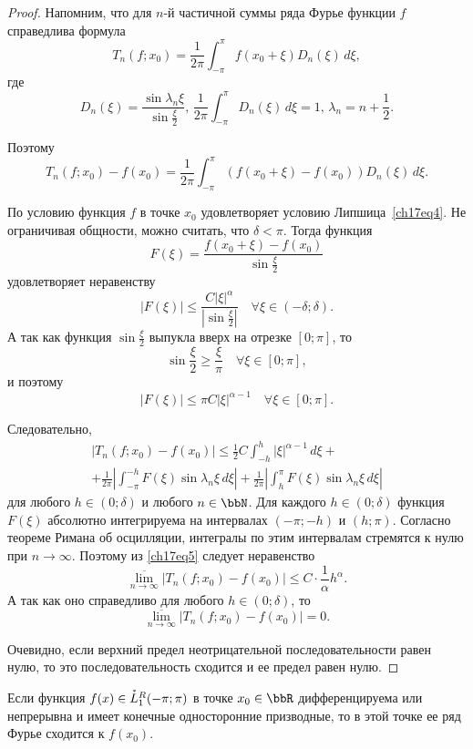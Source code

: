 \begin{proof}
Напомним, что для $n$-й частичной суммы ряда Фурье функции $f$ справедлива формула
$$
T_n(f;x_0) = \frac{1}{2\pi} \int_{-\pi}^{\pi} f(x_0 + \xi) D_n(\xi) \,d\xi,
$$
где
$$
D_n(\xi) = \frac{\sin{\lambda_n \xi}}{\sin{\frac{\xi}{2}}}, \, \frac{1}{2\pi}\int_{-\pi}^{\pi} D_n(\xi) \,d\xi = 1, \, \lambda_n = n + \frac12.
$$

Поэтому 
$$
T_n(f; x_0) - f(x_0) = \frac{1}{2\pi}\int_{-\pi}^{\pi}(f(x_0 + \xi) - f(x_0))D_n(\xi)\,d\xi.
$$

По условию функция $f$ в точке $x_0$ удовлетворяет условию Липшица~\eqref{ch17eq4}. Не ограничивая общности, можно считать, что $\delta < \pi$. Тогда функция 
$$
F(\xi) = \frac{f(x_0 + \xi) - f(x_0)}{\sin{\frac{\xi}{2}}}
$$
удовлетворяет неравенству
$$
|F(\xi)| \le \frac{C|\xi|^\alpha}{\left| \sin{\frac{\xi}{2}} \right|} \quad \forall \xi \in (-\delta; \delta).
$$
А так как функция $\sin{\frac{\xi}{2}}$ выпукла вверх на отрезке $[0; \pi]$, то
$$
\sin{\frac{\xi}{2}} \ge \frac{\xi}{\pi} \quad \forall \xi \in [0; \pi],
$$
и поэтому 
$$
|F(\xi)| \le \pi C |\xi|^{\alpha - 1} \quad \forall \xi \in [0; \pi].
$$

Следовательно,
\begin{multline} \label{ch17eq5}
|T_n(f; x_0) - f(x_0)| \le \frac{1}{2} C \int_{-h}^{h} |\xi|^{\alpha - 1}\,d\xi + \\
+ \frac{1}{2\pi} \left| \int_{-\pi}^{-h} F(\xi) \sin{\lambda_n \xi} \,d\xi \right| + \frac{1}{2\pi} \left| \int_{h}^{\pi} F(\xi) \sin{\lambda_n \xi} \,d\xi \right|
\end{multline}
для любого $h \in (0; \delta)$ и любого $n \in \bbN$. Для каждого $h \in (0;\delta)$ функция~$F(\xi)$ абсолютно интегрируема на интервалах $(-\pi; -h)$ и $(h; \pi)$. Согласно теореме Римана об осцилляции, интегралы по этим интервалам стремятся к нулю при $n \to \infty$. Поэтому из \eqref{ch17eq5} следует неравенство
$$
\overline{\lim\limits_{n \to \infty}}|T_n(f; x_0) - f(x_0)| \le C \cdot \frac{1}{\alpha}h^{\alpha}.
$$
А так как оно справедливо для любого $h \in (0; \delta)$, то 
$$
\overline{\lim\limits_{n \to \infty}}|T_n(f; x_0) - f(x_0)| = 0.
$$

Очевидно, если верхний предел неотрицательной последовательности равен нулю, то это последовательность сходится и ее предел равен нулю.
\end{proof}

\begin{cons}
Если функция $f(x) \in \accentset{*}{L}^{R}_1(-\pi;\pi)$ в точке $x_0 \in \bbR$ дифференцируема или непрерывна и имеет конечные односторонние призводные, то в этой точке ее ряд Фурье сходится к $f(x_0)$.
\end{cons}

